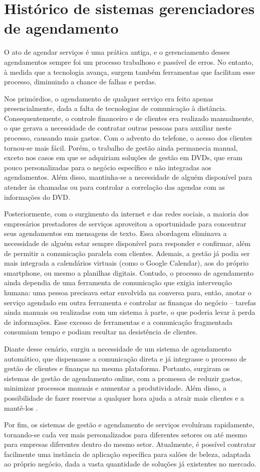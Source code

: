 \section{Histórico de sistemas gerenciadores de agendamento}

O ato de agendar serviços é uma prática antiga, e o gerenciamento desses agendamentos sempre foi um processo trabalhoso e passível de erros. No entanto, à medida que a tecnologia avança, surgem também ferramentas que facilitam esse processo, diminuindo a chance de falhas e perdas.

Nos primórdios, o agendamento de qualquer serviço era feito apenas presencialmente, dada a falta de tecnologias de comunicação à distância. Consequentemente, o controle financeiro e de clientes era realizado manualmente, o que gerava a necessidade de contratar outras pessoas para auxiliar neste processo, causando mais gastos. Com o advento do telefone, o acesso dos clientes tornou-se mais fácil. Porém, o trabalho de gestão ainda permanecia manual, exceto nos casos em que se adquiriam soluções de gestão em DVDs, que eram pouco personalizadas para o negócio específico e não integradas aos agendamentos. Além disso, mantinha-se a necessidade de alguém disponível para atender às chamadas ou para controlar a correlação das agendas com as informações do DVD.

Posteriormente, com o surgimento da internet e das redes sociais, a maioria dos empresários prestadores de serviços aproveitou a oportunidade para concentrar seus agendamentos em mensagens de texto. Essa abordagem eliminava a necessidade de alguém estar sempre disponível para responder e confirmar, além de permitir a comunicação paralela com clientes. Ademais, a gestão já podia ser mais integrada a calendários virtuais (como o Google Calendar), aos do próprio smartphone, ou mesmo a planilhas digitais. Contudo, o processo de agendamento ainda dependia de uma ferramenta de comunicação que exigia intervenção humana: uma pessoa precisava estar envolvida na conversa para, então, anotar o serviço agendado em outra ferramenta e controlar as finanças do negócio – tarefas ainda manuais ou realizadas com um sistema à parte, o que poderia levar à perda de informações. Esse excesso de ferramentas e a comunicação fragmentada consumiam tempo e podiam resultar na desistência de clientes.

Diante desse cenário, surgiu a necessidade de um sistema de agendamento automático, que dispensasse a comunicação direta e já integrasse o processo de gestão de clientes e finanças na mesma plataforma. Portanto, surgiram os sistemas de gestão de agendamento online, com a promessa de reduzir gastos, minimizar processos manuais e aumentar a produtividade. Além disso, a possibilidade de fazer reservas a qualquer hora ajuda a atrair mais clientes e a mantê-los \cite{reservio_2024}.

Por fim, os sistemas de gestão e agendamento de serviços evoluíram rapidamente, tornando-se cada vez mais personalizados para diferentes setores ou até mesmo para empresas diferentes dentro do mesmo setor. Atualmente, é possível contratar facilmente uma instância de aplicação específica para salões de beleza, adaptada ao próprio negócio, dada a vasta quantidade de soluções já existentes no mercado.